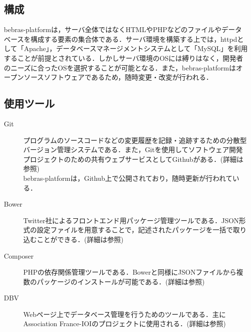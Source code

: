 \documentclass[a4paper]{jarticle}
\begin{document}
\begin{multicols}{2}
\subsection{構成}
bebras-platformは，サーバ全体ではなくHTMLやPHPなどのファイルやデータベースを構成する要素の集合体である．サーバ環境を構築する上では，httpdとして「Apache」，データベースマネージメントシステムとして「MySQL」を利用することが前提とされている．しかしサーバ環境のOSには縛りはなく，開発者のニーズに合ったOSを選択することが可能となる．また，bebras-platformはオープンソースソフトウェアであるため，随時変更・改変が行われる．

\subsection{使用ツール}
\begin{description}
\item[Git]プログラムのソースコードなどの変更履歴を記録・追跡するための分散型バージョン管理システムである．また，Gitを使用してソフトウェア開発プロジェクトのための共有ウェブサービスとしてGithubがある．(詳細は\cite{git}参照)\\ bebras-platformは，Github上で公開されており，随時更新が行われている．
\end{description}

\begin{description}
\item[Bower]Twitter社によるフロントエンド用パッケージ管理ツールである．JSON形式の設定ファイルを用意することで，記述されたパッケージを一括で取り込むことができる．(詳細は\cite{bower}参照)
\end{description}

\begin{description}
\item[Composer] PHPの依存関係管理ツールである．Bowerと同様にJSONファイルから複数のパッケージのインストールが可能である．(詳細は\cite{composer}参照)
\end{description}

\begin{description}
\item[DBV]  Webページ上でデータベース管理を行うためのツールである．主にAssociation France-IOIのプロジェクトに使用される．(詳細は\cite{dbv}参照)
\end{description}


\end{multicols}
\end{document}
